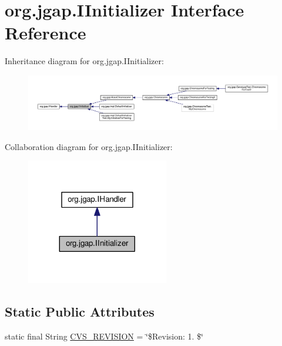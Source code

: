 \hypertarget{interfaceorg_1_1jgap_1_1_i_initializer}{\section{org.\-jgap.\-I\-Initializer Interface Reference}
\label{interfaceorg_1_1jgap_1_1_i_initializer}
}


Inheritance diagram for org.\-jgap.\-I\-Initializer\-:
\nopagebreak
\begin{figure}[H]
\begin{center}
\leavevmode
\includegraphics[width=350pt]{interfaceorg_1_1jgap_1_1_i_initializer__inherit__graph}
\end{center}
\end{figure}


Collaboration diagram for org.\-jgap.\-I\-Initializer\-:
\nopagebreak
\begin{figure}[H]
\begin{center}
\leavevmode
\includegraphics[width=176pt]{interfaceorg_1_1jgap_1_1_i_initializer__coll__graph}
\end{center}
\end{figure}
\subsection*{Static Public Attributes}
\begin{DoxyCompactItemize}
\item 
static final String \hyperlink{interfaceorg_1_1jgap_1_1_i_initializer_af84c0edbc3fdf99bda88da8d4ed1d2ea}{C\-V\-S\-\_\-\-R\-E\-V\-I\-S\-I\-O\-N} = \char`\"{}\$Revision\-: 1. \$\char`\"{}
\end{DoxyCompactItemize}
